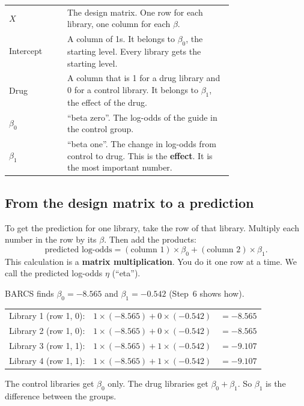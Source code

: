 \documentclass[12pt]{article}
\begin{document}
\begin{symbols}
\begin{tabular}{@{}l p{0.74\linewidth}@{}}
$X$ & The design matrix. One row for each library, one column for each
      $\beta$.\\
Intercept & A column of 1s. It belongs to $\beta_0$, the starting level.
      Every library gets the starting level.\\
Drug & A column that is 1 for a drug library and 0 for a control library.
      It belongs to $\beta_1$, the effect of the drug.\\
$\beta_0$ & ``beta zero''. The log-odds of the guide in the control group.\\
$\beta_1$ & ``beta one''. The change in log-odds from control to drug. This
      is the \textbf{effect}. It is the most important number.\\
\end{tabular}
\end{symbols}

\subsection{From the design matrix to a prediction}

To get the prediction for one library, take the row of that library. Multiply
each number in the row by its $\beta$. Then add the products:
\[
\text{predicted log-odds} = (\text{column 1}) \times \beta_0 +
(\text{column 2}) \times \beta_1 .
\]
This calculation is a \textbf{matrix multiplication}. You do it one row at
a time. We call the predicted log-odds $\eta$ (``eta'').

\begin{worked}
BARCS finds $\beta_0 = -8.565$ and $\beta_1 = -0.542$ (Step~6 shows how).

\begin{tabular}{@{}lll@{}}
Library 1 (row 1, 0): & $1 \times (-8.565) + 0 \times (-0.542)$ & $= -8.565$\\
Library 2 (row 1, 0): & $1 \times (-8.565) + 0 \times (-0.542)$ & $= -8.565$\\
Library 3 (row 1, 1): & $1 \times (-8.565) + 1 \times (-0.542)$ & $= -9.107$\\
Library 4 (row 1, 1): & $1 \times (-8.565) + 1 \times (-0.542)$ & $= -9.107$\\
\end{tabular}

\smallskip
The control libraries get $\beta_0$ only. The drug libraries get
$\beta_0 + \beta_1$. So $\beta_1$ is the difference between the groups.
\end{worked}
\end{document}
